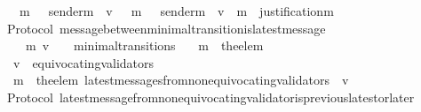 \begin{isabellebody}
\ \ {\isasymlongrightarrow}\ {\isacharparenleft}{\isasymforall}\ m{}\ {\isasymin}\ {\isasymsigma}{}{\isachardot}\ sender{\isacharparenleft}m{}{\isacharparenright}\ {\isacharequal}\ v\ {\isasymlongrightarrow}\ {\isacharparenleft}{\isasymforall}\ m{}\ {\isasymin}\ {\isasymsigma}{}{\isachardot}\ sender{\isacharparenleft}m{}{\isacharparenright}\ {\isacharequal}\ v\ {\isasymlongrightarrow}\ m{}\ {\isasymin}\ justification{\isacharparenleft}m{}{\isacharparenright}{\isacharparenright}{\isacharparenright}{\isachardoublequoteclose}\isanewline
%
\isadelimproof
\ \ %
\endisadelimproof
%
\isatagproof
{}\isamarkupfalse%
%
\endisatagproof
{\isafoldproof}%
%
\isadelimproof
\isanewline
%
\endisadelimproof
\isanewline
\isanewline
{}\isamarkupfalse%
\ {\isacharparenleft}\ Protocol{\isacharparenright}\ message{\isacharunderscore}between{\isacharunderscore}minimal{\isacharunderscore}transition{\isacharunderscore}is{\isacharunderscore}latest{\isacharunderscore}message\ {\isacharcolon}\isanewline
\ \ {\isachardoublequoteopen}{\isasymforall}\ {\isasymsigma}\ {\isasymsigma}{\isacharprime}\ m{\isacharprime}\ v{\isachardot}\ {\isacharparenleft}{\isasymsigma}{\isacharcomma}\ {\isasymsigma}{\isacharprime}{\isacharparenright}\ {\isasymin}\ minimal{\isacharunderscore}transitions\isanewline
\ \ {\isasymlongrightarrow}\ m{\isacharprime}\ {\isacharequal}\ the{\isacharunderscore}elem\ {\isacharparenleft}{\isasymsigma}{\isacharprime}\ {\isacharminus}\ {\isasymsigma}{\isacharparenright}\isanewline
\ \ {\isasymlongrightarrow}\ v\ {\isasymnotin}\ equivocating{\isacharunderscore}validators\ {\isasymsigma}{\isacharprime}\isanewline
\ \ {\isasymlongrightarrow}\ m{\isacharprime}\ {\isacharequal}\ the{\isacharunderscore}elem\ {\isacharparenleft}latest{\isacharunderscore}messages{\isacharunderscore}from{\isacharunderscore}non{\isacharunderscore}equivocating{\isacharunderscore}validators\ {\isasymsigma}{\isacharprime}\ v{\isacharparenright}{\isachardoublequoteclose}\isanewline
%
\isadelimproof
\ \ %
\endisadelimproof
%
\isatagproof
{}\isamarkupfalse%
%
\endisatagproof
{\isafoldproof}%
%
\isadelimproof
\isanewline
%
\endisadelimproof
\isanewline
\isanewline
{}\isamarkupfalse%
\ {\isacharparenleft}\ Protocol{\isacharparenright}\ latest{\isacharunderscore}message{\isacharunderscore}from{\isacharunderscore}non{\isacharunderscore}equivocating{\isacharunderscore}validator{\isacharunderscore}is{\isacharunderscore}previous{\isacharunderscore}latest{\isacharunderscore}or{\isacharunderscore}later{\isacharcolon}\isanewline

\end{isabellebody}
